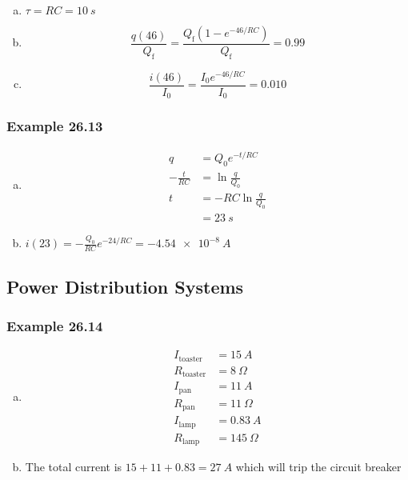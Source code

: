 \documentclass{article}
\begin{document}
\begin{enumerate}[(a)]
  \item $\tau = R C = \qty{10}{s}$

  \item \[\frac{q(46)}{Q_\textrm{f}} = \frac{Q_\textrm{f} (1 - e^{-46 / R C})}{Q_\textrm{f}} = 0.99\]

  \item \[\frac{i(46)}{I_0} = \frac{I_0 e^{-46 / R C}}{I_0} = 0.010\]
\end{enumerate}

\subsubsection{Example 26.13}

\begin{enumerate}[(a)]
  \item

        \begin{align*}
          q              & = Q_0 e^{-t / RC}        \\
          -\frac{t}{R C} & = \ln \frac{q}{Q_0}      \\
          t              & = -R C \ln \frac{q}{Q_0} \\
                         & = \qty{23}{s}
        \end{align*}

  \item $i(23) = -\frac{Q_0}{R C} e^{-24 / R C} = \qty{-4.54e-8}{A}$
\end{enumerate}

\subsection{Power Distribution Systems}

\subsubsection{Example 26.14}

\begin{enumerate}[(a)]
  \item

        \begin{align*}
          I_\textrm{toaster} & = \qty{15}{A}       \\
          R_\textrm{toaster} & = \qty{8}{\Omega}   \\
          I_\textrm{pan}     & = \qty{11}{A}       \\
          R_\textrm{pan}     & = \qty{11}{\Omega}  \\
          I_\textrm{lamp}    & = \qty{0.83}{A}     \\
          R_\textrm{lamp}    & = \qty{145}{\Omega}
        \end{align*}

  \item The total current is $15 + 11 + 0.83 = \qty{27}{A}$ which will trip the circuit breaker
\end{enumerate}
\end{document}
